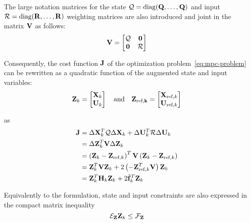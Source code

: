 \documentclass[../main.tex]{subfiles}
\begin{document}
The large notation matrices for the state $\mathcal{Q} = \text{diag}(\mathbf{Q},
\ldots, \mathbf{Q})$ and input $\mathcal{R} = \text{diag}(\mathbf{R}, \ldots, \mathbf{R})$
weighting matrices are also introduced and joint in the matrix $\mathbf{V}$ as
follows:
\begin{equation*}
	\mathbf{V} = \begin{bmatrix}
		\mathcal{Q} & \mathbf{0}\\
		\mathbf{0} & \mathcal{R}
	\end{bmatrix}
\end{equation*}

Consequently, the cost function $\mathbf{J}$ of the optimization
problem~\ref{eq:mpc-problem} can be rewritten as a quadratic function of the
augmented state and input variables:
\begin{equation*}
	\mathbf{Z}_k = \begin{bmatrix}
		\mathbf{X}_k\\
		\mathbf{U}_k
	\end{bmatrix}
	\quad \text{and} \quad
	\mathbf{Z_{\text{ref},k}} = \begin{bmatrix}
		\mathbf{X}_{\text{ref},k}\\
		\mathbf{U}_{\text{ref},k}
	\end{bmatrix}
\end{equation*}

as
\begin{equation*}
	\begin{aligned}
		\mathbf{J} &= \Delta \mathbf{X}_k^T \mathcal{Q} \Delta \mathbf{X}_k + \Delta \mathbf{U}_k^T
	\mathcal{R} \Delta \mathbf{U}_k\\
				&= \Delta \mathbf{Z}_k^T \mathbf{V} \Delta \mathbf{Z}_k\\
				&= \left( \mathbf{Z}_k - \mathbf{Z}_{\text{ref},k} \right)^T \mathbf{V}
				\left( \mathbf{Z}_k - \mathbf{Z}_{\text{ref},k} \right)\\
				&= \mathbf{Z}_k^T \mathbf{V} \mathbf{Z}_k + 2 \left( -
				\mathbf{Z}_{\text{ref},k}^T \mathbf{V} \right) \mathbf{Z}_k\\
				&= \mathbf{Z}_k^T \mathbf{H}_k \mathbf{Z}_k + 2 \tilde{\mathbf{f}}_k^T \mathbf{Z}_k
	\end{aligned}
\end{equation*}

Equivalently to the  formulation, state and input constraints are
also expressed in the compact matrix inequality
\begin{equation*}
	\mathcal{E}_{\mathbf{Z}} \mathbf{Z}_k \leq \mathcal{F}_{\mathbf{Z}}
\end{equation*}
\end{document}
